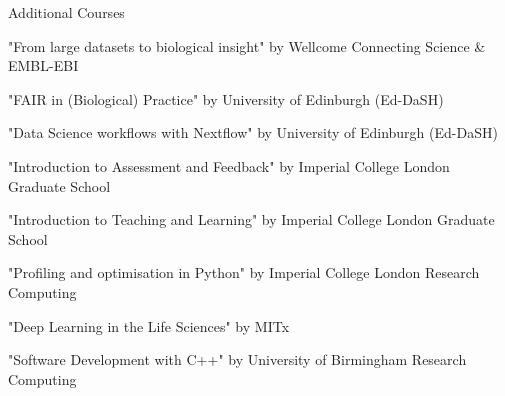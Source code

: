 \documentclass{resume}
\begin{document}
\begin{rSection}{Additional Courses}

\item "From large datasets to biological insight" by Wellcome Connecting Science \& EMBL-EBI
\vspace{2pt plus 1pt minus 1pt}

\item "FAIR in (Biological) Practice" by University of Edinburgh (Ed-DaSH)
\vspace{2pt plus 1pt minus 1pt}

\item "Data Science workflows with Nextflow" by University of Edinburgh (Ed-DaSH)
\vspace{2pt plus 1pt minus 1pt}

\item "Introduction to Assessment and Feedback" by Imperial College London Graduate School
\vspace{2pt plus 1pt minus 1pt}

\item "Introduction to Teaching and Learning" by Imperial College London Graduate School
\vspace{2pt plus 1pt minus 1pt}

\item "Profiling and optimisation in Python" by Imperial College London Research Computing
\vspace{2pt plus 1pt minus 1pt}

\item "Deep Learning in the Life Sciences" by MITx
\vspace{2pt plus 1pt minus 1pt}

\item "Software Development with C++" by University of Birmingham Research Computing
\vspace{2pt plus 1pt minus 1pt}

\end{rSection}



\end{document}
